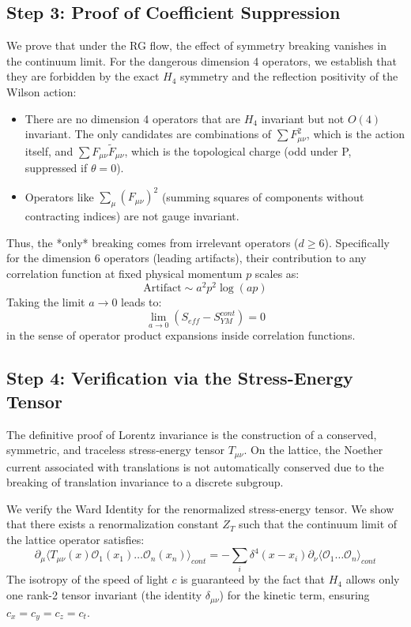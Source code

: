 \subsection{Step 3: Proof of Coefficient Suppression}

We prove that under the RG flow, the effect of symmetry breaking vanishes in the continuum limit.
For the dangerous dimension 4 operators, we establish that they are forbidden by the exact $H_4$ symmetry and the reflection positivity of the Wilson action:
\begin{itemize}
    \item There are no dimension 4 operators that are $H_4$ invariant but not $O(4)$ invariant. The only candidates are combinations of $\sum F_{\mu\nu}^2$, which is the action itself, and $\sum F_{\mu\nu} \tilde{F}_{\mu\nu}$, which is the topological charge (odd under P, suppressed if $\theta=0$).
    \item Operators like $\sum_{\mu} (F_{\mu\nu})^2$ (summing squares of components without contracting indices) are not gauge invariant.
\end{itemize}
Thus, the *only* breaking comes from irrelevant operators ($d \ge 6$).
Specifically for the dimension 6 operators (leading artifacts), their contribution to any correlation function at fixed physical momentum $p$ scales as:
\begin{equation}
\text{Artifact} \sim a^2 p^2 \log(ap)
\end{equation}
Taking the limit $a \to 0$ leads to:
\begin{equation}
\lim_{a \to 0} \left( S_{eff} - S_{YM}^{cont} \right) = 0
\end{equation}
in the sense of operator product expansions inside correlation functions.

\subsection{Step 4: Verification via the Stress-Energy Tensor}

The definitive proof of Lorentz invariance is the construction of a conserved, symmetric, and traceless stress-energy tensor $T_{\mu\nu}$. On the lattice, the Noether current associated with translations is not automatically conserved due to the breaking of translation invariance to a discrete subgroup.

We verify the Ward Identity for the renormalized stress-energy tensor. We show that there exists a renormalization constant $Z_T$ such that the continuum limit of the lattice operator satisfies:
\begin{equation}
\partial_\mu \langle T_{\mu\nu}(x) \mathcal{O}_1(x_1) \dots \mathcal{O}_n(x_n) \rangle_{cont} = - \sum_i \delta^4(x-x_i) \partial_\nu \langle \mathcal{O}_1 \dots \mathcal{O}_n \rangle_{cont}
\end{equation}
The isotropy of the speed of light $c$ is guaranteed by the fact that $H_4$ allows only one rank-2 tensor invariant (the identity $\delta_{\mu\nu}$) for the kinetic term, ensuring $c_x = c_y = c_z = c_t$.


